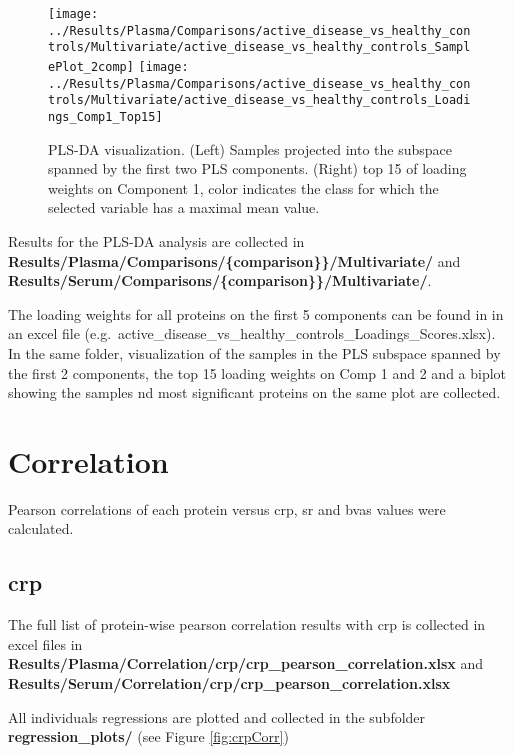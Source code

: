 \documentclass[
]{book}
\begin{document}
\begin{figure}

{\centering \texttt{[image: ../Results/Plasma/Comparisons/active\_disease\_vs\_healthy\_controls/Multivariate/active\_disease\_vs\_healthy\_controls\_SamplePlot\_2comp]} \texttt{[image: ../Results/Plasma/Comparisons/active\_disease\_vs\_healthy\_controls/Multivariate/active\_disease\_vs\_healthy\_controls\_Loadings\_Comp1\_Top15]} 

}

\caption{PLS-DA visualization. (Left) Samples projected into the subspace spanned by the first two PLS components. (Right) top 15 of loading weights on Component 1, color indicates the class for which the selected variable has a maximal mean value.}\label{fig:plsPlot}
\end{figure}

Results for the PLS-DA analysis are collected in \textbf{Results/Plasma/Comparisons/\{comparison\}\}/Multivariate/} and \textbf{Results/Serum/Comparisons/\{comparison\}\}/Multivariate/}.

The loading weights for all proteins on the first 5 components can be found in in an excel file (e.g.~active\_disease\_vs\_healthy\_controls\_Loadings\_Scores.xlsx). In the same folder, visualization of the samples in the PLS subspace spanned by the first 2 components, the top 15 loading weights on Comp 1 and 2 and a biplot showing the samples nd most significant proteins on the same plot are collected.

\hypertarget{correlation}{%
\chapter{Correlation}\label{correlation}}

Pearson correlations of each protein versus crp, sr and bvas values were calculated.

\hypertarget{crp}{%
\section{crp}\label{crp}}

The full list of protein-wise pearson correlation results with crp is collected in excel files in \textbf{Results/Plasma/Correlation/crp/crp\_pearson\_correlation.xlsx} and \textbf{Results/Serum/Correlation/crp/crp\_pearson\_correlation.xlsx}

All individuals regressions are plotted and collected in the subfolder \textbf{regression\_plots/} (see Figure \ref{fig:crpCorr})
\end{document}
